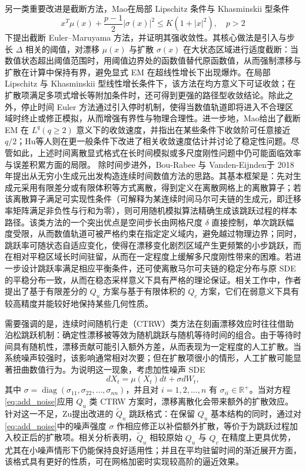 另一类重要改进是截断方法，Mao\cite{mao2015truncated}在局部 Lipschitz 条件与 Khasminskii 型条件
\begin{equation}\label{eq:Khasminskii}
	x^{T} \mu(x)+\frac{p-1}{2}|\sigma(x)|^{2} \leq K\left(1+|x|^{2}\right), \quad p > 2
\end{equation}
下提出截断 Euler--Maruyama 方法，并证明其强收敛性。其核心做法是引入与步长 $\Delta$ 相关的阈值，对漂移 $\mu(x)$ 与扩散 $\sigma(x)$ 在大状态区域进行适度截断：当数值状态超出阈值范围时，用阈值边界处的函数值替代原函数值，从而强制漂移与扩散在计算中保持有界，避免显式 EM 在超线性增长下出现爆炸。在局部 Lipschitz 与 Khasminskii 型线性增长条件下，该方法在均方意义下可证收敛；在扩散项满足多项式增长等附加条件时，还可得到更强的路径型收敛结论。除此之外，停止时间 Euler 方法\cite{liu2013strong}通过引入停时机制，使得当数值轨道即将进入不合理区域时终止或修正模拟，从而增强有界性与物理合理性。进一步地，Mao\cite{mao2016convergence}给出了截断 EM 在 $L^{q}(q\ge 2)$ 意义下的收敛速度，并指出在某些条件下收敛阶可任意接近 $q/2$；Hu等人\cite{Hu2018}则在更一般条件下改进了相关收敛速度估计并讨论了稳定性问题。尽管如此，上述时间离散显式格式在长时间模拟或多尺度刚性问题中仍可能面临效率与误差积累方面的局限。
除时间步进外，Bou-Rabee 与 Vanden-Eijnden\cite{bou2018continuous}于 2018 年提出从无穷小生成元出发构造连续时间数值方法的思路。其基本框架是：先对生成元采用有限差分或有限体积等方式离散，得到定义在离散网格上的离散算子；若该离散算子满足可实现性条件（可解释为某连续时间马尔可夫链的生成元，即迁移率矩阵满足非负性与行和为零），则可用随机模拟算法精确生成该跳跃过程的样本路径。该类方法的一个突出优点是空间步长由网格尺度 $\delta$ 直接控制，单次跳跃幅度受限，从而数值轨道可被严格约束在指定定义域内，避免越过物理边界；同时，跳跃率可随状态自适应变化，使得在漂移变化剧烈区域产生更频繁的小步跳跃，而在相对平稳区域长时间驻留，从而在一定程度上缓解多尺度刚性带来的困难。若进一步设计跳跃率满足相应平衡条件，还可使离散马尔可夫链的稳定分布与原 SDE 的平稳分布一致，从而在稳态采样意义下具有严格的理论保证。相关工作中，作者提出了基于有限差分的 $Q_u$ 方案与基于有限体积的 $Q_c$ 方案，它们在弱意义下具有较高精度并能较好地保持某些几何性质。

需要强调的是，连续时间随机行走（CTRW）类方法在刻画漂移效应时往往借助泊松跳跃机制：确定性漂移被等效为随机跳跃与随机等待时间的组合。由于等待时间具有随机性，漂移贡献可能引入额外方差，从而表现为一定程度的人工扩散。当系统噪声较强时，该影响通常相对次要；但在扩散项很小的情形，人工扩散可能显著扭曲数值行为。为说明这一现象，考虑加性噪声 SDE
\begin{equation}\label{eq:add_noise}
	dX_{t}=\mu\left(X_{t}\right) d t+\sigma d W_{t},
\end{equation}
其中 $\sigma=\operatorname{diag}\left(\sigma_{11}, \sigma_{22}, \ldots, \sigma_{nn}\right)$，并且对 $i=1,2,\ldots,n$ 有 $\sigma_{ii}\in\mathbb{R}^{+}$。当对方程\eqref{eq:add_noise}应用 $Q_u$ 类 CTRW 方案时，漂移离散化会带来额外的扩散效应。针对这一不足，Zu\cite{zu2023random}提出改进的 $\tilde{Q}_u$ 跳跃格式：在保留 $Q_u$ 基本结构的同时，通过对\eqref{eq:add_noise}中的噪声强度 $\sigma$ 作相应修正以补偿额外扩散，等价于为跳跃过程加入校正后的扩散项。相关分析表明，$\tilde{Q}_u$ 相较原始 $Q_u$ 与 $Q_c$ 在精度上更具优势，尤其在小噪声情形下仍能保持良好适用性；并且在平均驻留时间的渐近展开方面，该格式具有更好的性质，可在网格加密时实现较高阶的逼近效果。

